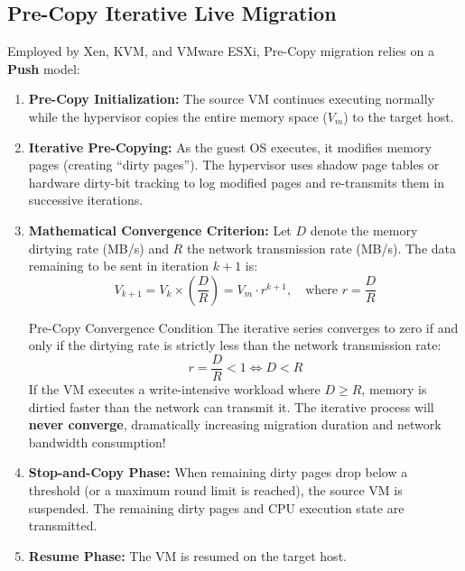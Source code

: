 \subsection{Pre-Copy Iterative Live Migration}
Employed by Xen, KVM, and VMware ESXi, Pre-Copy migration relies on a \textbf{Push} model:
\begin{enumerate}[leftmargin=*]
  \item \textbf{Pre-Copy Initialization:} The source VM continues executing normally while the hypervisor copies the entire memory space ($V_m$) to the target host.
  \item \textbf{Iterative Pre-Copying:} As the guest OS executes, it modifies memory pages (creating ``dirty pages''). The hypervisor uses shadow page tables or hardware dirty-bit tracking to log modified pages and re-transmits them in successive iterations.
  \item \textbf{Mathematical Convergence Criterion:}
    Let $D$ denote the memory dirtying rate (MB/s) and $R$ the network transmission rate (MB/s). The data remaining to be sent in iteration $k+1$ is:
    \begin{equation}
    V_{k+1} = V_k \times \left( \frac{D}{R} \right) = V_m \cdot r^{k+1}, \quad \text{where } r = \frac{D}{R}
    \end{equation}
    \begin{thmbox}{Pre-Copy Convergence Condition}
    The iterative series converges to zero if and only if the dirtying rate is strictly less than the network transmission rate:
    \begin{equation}
    r = \frac{D}{R} < 1 \iff D < R
    \end{equation}
    If the VM executes a write-intensive workload where $D \ge R$, memory is dirtied faster than the network can transmit it. The iterative process will \textbf{never converge}, dramatically increasing migration duration and network bandwidth consumption!
    \end{thmbox}
  \item \textbf{Stop-and-Copy Phase:} When remaining dirty pages drop below a threshold (or a maximum round limit is reached), the source VM is suspended. The remaining dirty pages and CPU execution state are transmitted.
  \item \textbf{Resume Phase:} The VM is resumed on the target host.
\end{enumerate}

